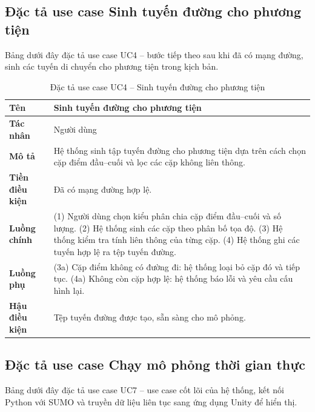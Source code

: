 ﻿\documentclass[../DoAn.tex]{subfiles}
\begin{document}
\subsection{Đặc tả use case Sinh tuyến đường cho phương tiện}

Bảng dưới đây đặc tả use case UC4 -- bước tiếp theo sau khi đã có mạng đường,
sinh các tuyến di chuyển cho phương tiện trong kịch bản.

\begin{table}[H]
	\centering
	\caption{Đặc tả use case UC4 -- Sinh tuyến đường cho phương tiện}
	\begin{tabular}{|p{}|p{}|}
		\hline
		\textbf{Tên} & Sinh tuyến đường cho phương tiện \\ \hline
		\textbf{Tác nhân} & Người dùng \\ \hline
		\textbf{Mô tả} & Hệ thống sinh tập tuyến đường cho phương tiện dựa trên cách chọn cặp điểm đầu--cuối và lọc các cặp không liên thông. \\ \hline
		\textbf{Tiền điều kiện} & Đã có mạng đường hợp lệ. \\ \hline
		\textbf{Luồng chính} & (1) Người dùng chọn kiểu phân chia cặp điểm đầu--cuối và số lượng. (2) Hệ thống sinh các cặp theo phân bố tọa độ. (3) Hệ thống kiểm tra tính liên thông của từng cặp. (4) Hệ thống ghi các tuyến hợp lệ ra tệp tuyến đường. \\ \hline
		\textbf{Luồng phụ} & (3a) Cặp điểm không có đường đi: hệ thống loại bỏ cặp đó và tiếp tục. (4a) Không còn cặp hợp lệ: hệ thống báo lỗi và yêu cầu cấu hình lại. \\ \hline
		\textbf{Hậu điều kiện} & Tệp tuyến đường được tạo, sẵn sàng cho mô phỏng. \\
		\hline
	\end{tabular}
\end{table}

\subsection{Đặc tả use case Chạy mô phỏng thời gian thực}

Bảng dưới đây đặc tả use case UC7 -- use case cốt lõi của hệ thống, kết nối
Python với \gls{SUMO} và truyền dữ liệu liên tục sang ứng dụng Unity để hiển thị.
\end{document}
